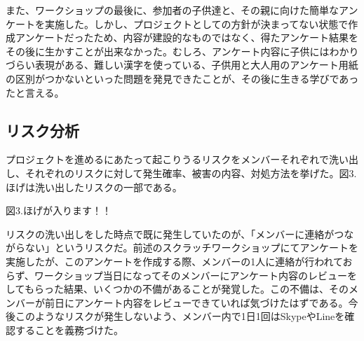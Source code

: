 \documentclass[openany,11pt,papersize]{jsbook}
\begin{document}
\par また、ワークショップの最後に、参加者の子供達と、その親に向けた簡単なアンケートを実施した。しかし、プロジェクトとしての方針が決まってない状態で作成アンケートだったため、内容が建設的なものではなく、得たアンケート結果をその後に生かすことが出来なかった。むしろ、アンケート内容に子供にはわかりづらい表現がある、難しい漢字を使っている、子供用と大人用のアンケート用紙の区別がつかないといった問題を発見できたことが、その後に生きる学びであったと言える。


\subsection{リスク分析}
\par プロジェクトを進めるにあたって起こりうるリスクをメンバーそれぞれで洗い出し、それぞれのリスクに対して発生確率、被害の内容、対処方法を挙げた。図3.ほげは洗い出したリスクの一部である。

\begin{hissu}
図3.ほげが入ります！！
\end{hissu}

\par リスクの洗い出しをした時点で既に発生していたのが、「メンバーに連絡がつながらない」というリスクだ。前述のスクラッチワークショップにてアンケートを実施したが、このアンケートを作成する際、メンバーの1人に連絡が行われておらず、ワークショップ当日になってそのメンバーにアンケート内容のレビューをしてもらった結果、いくつかの不備があることが発覚した。この不備は、そのメンバーが前日にアンケート内容をレビューできていれば気づけたはずである。今後このようなリスクが発生しないよう、メンバー内で1日1回はSkypeやLineを確認することを義務づけた。
\end{document}
